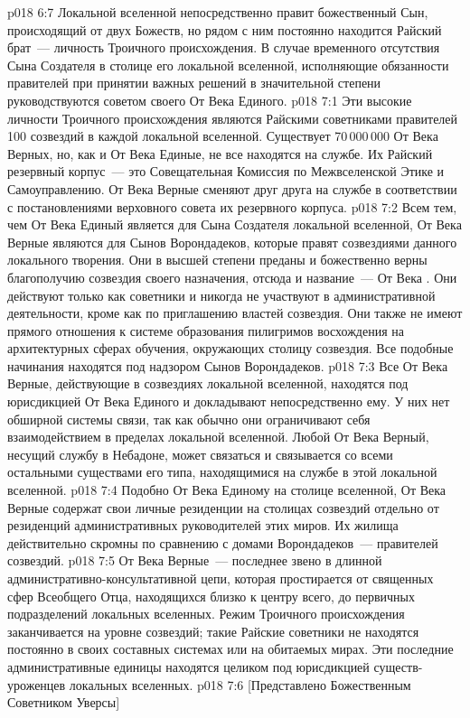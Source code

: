 \vs p018 6:7 Локальной вселенной непосредственно правит божественный Сын, происходящий от двух Божеств, но рядом с ним постоянно находится Райский брат~--- личность Троичного происхождения. В случае временного отсутствия Сына Создателя в столице его локальной вселенной, исполняющие обязанности правителей при принятии важных решений в значительной степени руководствуются советом своего От Века Единого.
\vs p018 7:1 Эти высокие личности Троичного происхождения являются Райскими советниками правителей 100 созвездий в каждой локальной вселенной. Существует 70\,000\,000 От Века Верных, но, как и От Века Единые, не все находятся на службе. Их Райский резервный корпус~--- это Совещательная Комиссия по Межвселенской Этике и Самоуправлению. От Века Верные сменяют друг друга на службе в соответствии с постановлениями верховного совета их резервного корпуса.
\vs p018 7:2 Всем тем, чем От Века Единый является для Сына Создателя локальной вселенной, От Века Верные являются для Сынов Ворондадеков, которые правят созвездиями данного локального творения. Они в высшей степени преданы и божественно верны благополучию созвездия своего назначения, отсюда и название~--- От Века . Они действуют только как советники и никогда не участвуют в административной деятельности, кроме как по приглашению властей созвездия. Они также не имеют прямого отношения к системе образования пилигримов восхождения на архитектурных сферах обучения, окружающих столицу созвездия. Все подобные начинания находятся под надзором Сынов Ворондадеков.
\vs p018 7:3 Все От Века Верные, действующие в созвездиях локальной вселенной, находятся под юрисдикцией От Века Единого и докладывают непосредственно ему. У них нет обширной системы связи, так как обычно они ограничивают себя взаимодействием в пределах локальной вселенной. Любой От Века Верный, несущий службу в Небадоне, может связаться и связывается со всеми остальными существами его типа, находящимися на службе в этой локальной вселенной.
\vs p018 7:4 Подобно От Века Единому на столице вселенной, От Века Верные содержат свои личные резиденции на столицах созвездий отдельно от резиденций административных руководителей этих миров. Их жилища действительно скромны по сравнению с домами Ворондадеков~--- правителей созвездий.
\vs p018 7:5 От Века Верные~--- последнее звено в длинной административно\hyp{}консультативной цепи, которая простирается от священных сфер Всеобщего Отца, находящихся близко к центру всего, до первичных подразделений локальных вселенных. Режим Троичного происхождения заканчивается на уровне созвездий; такие Райские советники не находятся постоянно в своих составных системах или на обитаемых мирах. Эти последние административные единицы находятся целиком под юрисдикцией существ\hyp{}уроженцев локальных вселенных.
\vsetoff
\vs p018 7:6 [Представлено Божественным Советником Уверсы]
\quizlink
